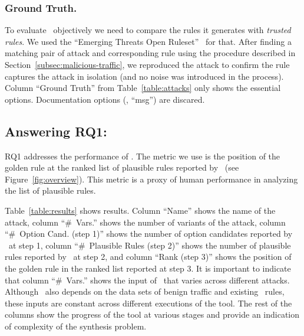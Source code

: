 \documentclass[sigconf,review, anonymous]{acmart}
\begin{document}

\subsubsection{Ground Truth.}To evaluate \tname\ objectively we need
to compare the rules it generates with \emph{trusted rules}. We used
the ``Emerging Threats Open Ruleset''~\cite{emerging-threats-open} for
that. After finding a matching pair of attack and corresponding rule
using the procedure described in
Section~\ref{subsec:malicious-traffic}, we reproduced the attack to
confirm the rule captures the attack in isolation (and no noise was
introduced in the process). Column ``Ground Truth'' from
Table~\ref{table:attacks} only shows the essential
options. Documentation options (\eg{}, ``msg'') are discared.

\subsection{Answering RQ1: \textRQone}
\label{sec:answer-rqone}

RQ1 addresses the performance of \tname. The metric we use is the
position of the golden rule at the ranked list of plausible rules
reported by \tname\ (see Figure~\ref{fig:overview}). This metric is a
proxy of human performance in analyzing the list of plausible rules.


Table~\ref{table:results} shows results. Column ``Name'' shows the
name of the attack, column ``\#~Vars.'' shows the number of variants
of the attack, column ``\#~Option Cand. (step 1)'' shows the number of
option candidates reported by \tname\ at step 1, column ``\#~Plausible
Rules (step 2)'' shows the number of plausible rules reported by
\tname\ at step 2, and column ``Rank (step 3)'' shows the position of the
golden rule in the ranked list reported at step 3.
It is important to indicate that column ``\#~Vars.'' shows the input of
\tname\ that varies across different attacks. Although \tname\ also
depends on the data sets of benign traffic and existing \suri\ rules,
these inputs are constant across different executions of the tool. The
rest of the columns show the progress of the tool at various stages
and provide an indication of complexity of the synthesis problem.
\end{document}
